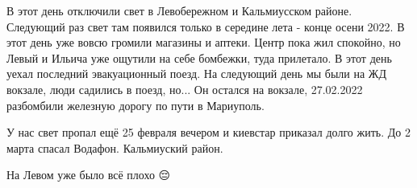  
 
 
 
 

\qqSecCmt


В этот день отключили свет в Левобережном и Кальмиусском районе. Следующий раз
свет там появился только в середине лета - конце осени 2022. В этот день уже
вовсю громили магазины и аптеки. Центр пока жил спокойно, но Левый и Ильича уже
ощутили на себе бомбежки, туда прилетало. В этот день уехал последний
эвакуационный поезд. На следующий день мы были на ЖД вокзале, люди садились в
поезд, но... Он остался на вокзале, 27.02.2022 разбомбили железную дорогу по
пути в Мариуполь.


У нас свет пропал ещё 25 февраля вечером и киевстар приказал долго жить. До 2
марта спасал Водафон. Кальмиуский район.


На Левом уже было всё плохо 😔
